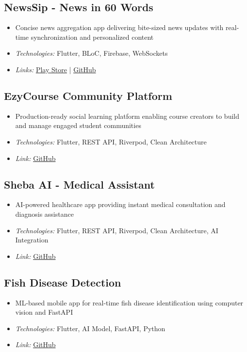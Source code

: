 \documentclass[a4paper,11pt]{article}
\begin{document}
\subsection{NewsSip - News in 60 Words}
\begin{itemize}[leftmargin=*,noitemsep,topsep=4pt]
    \item Concise news aggregation app delivering bite-sized news updates with real-time synchronization and personalized content
    \item \textit{Technologies:} Flutter, BLoC, Firebase, WebSockets
    \item \textit{Links:} \href{https://play.google.com/store/apps/details?id=com.heapiphy.newssip}{Play Store} | \href{https://github.com/Heapiphy/bulletins.git}{GitHub}
\end{itemize}

\subsection{EzyCourse Community Platform}
\begin{itemize}[leftmargin=*,noitemsep,topsep=4pt]
    \item Production-ready social learning platform enabling course creators to build and manage engaged student communities
    \item \textit{Technologies:} Flutter, REST API, Riverpod, Clean Architecture
    \item \textit{Link:} \href{https://github.com/riyad-from-space/Ezycourse-Community.git}{GitHub}
\end{itemize}

\subsection{Sheba AI - Medical Assistant}
\begin{itemize}[leftmargin=*,noitemsep,topsep=4pt]
    \item AI-powered healthcare app providing instant medical consultation and diagnosis assistance
    \item \textit{Technologies:} Flutter, REST API, Riverpod, Clean Architecture, AI Integration
    \item \textit{Link:} \href{https://github.com/Noctambulist007/Sheba_AI.git}{GitHub}
\end{itemize}

\subsection{Fish Disease Detection}
\begin{itemize}[leftmargin=*,noitemsep,topsep=4pt]
    \item ML-based mobile app for real-time fish disease identification using computer vision and FastAPI
    \item \textit{Technologies:} Flutter, AI Model, FastAPI, Python
    \item \textit{Link:} \href{https://github.com/riyad-from-space/Fish-Disease-Detection-App.git}{GitHub}
\end{itemize}
\end{document}

